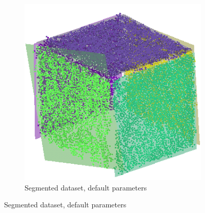 \begin{figure}[htb]
    \centering

    \begin{subfigure}[b]{0.5\textwidth}
        \centering
        \includegraphics[width=0.7\linewidth]{images/results_cube}
        \caption{Segmented dataset, default parameters}
        \label{fig:real-data-ransac-segmented}
    \end{subfigure}%

    \vspace{0.5em}


\end{figure}
